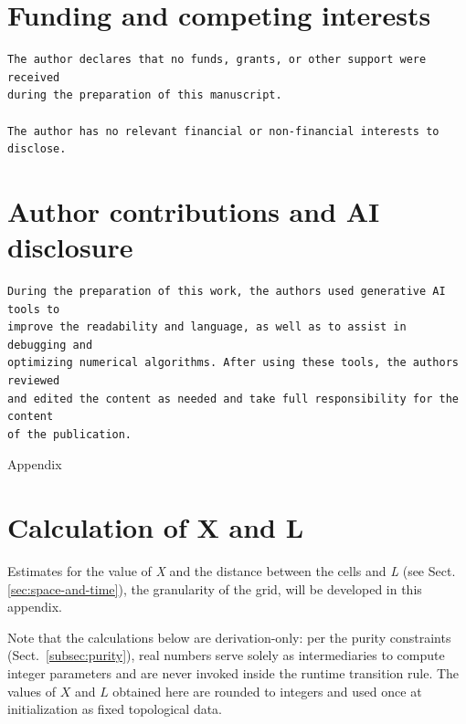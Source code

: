 \documentclass{ijuc}
\begin{document}

\section*{Funding and competing interests}
\begin{verbatim}
The author declares that no funds, grants, or other support were received 
during the preparation of this manuscript.

The author has no relevant financial or non-financial interests to disclose.
\end{verbatim}

\section*{Author contributions and AI disclosure}
\begin{verbatim}
During the preparation of this work, the authors used generative AI tools to
improve the readability and language, as well as to assist in debugging and
optimizing numerical algorithms. After using these tools, the authors reviewed
and edited the content as needed and take full responsibility for the content
of the publication.
\end{verbatim}

\printbibliography

\newpage{}


\appendix
\begin{center}
{\LARGE{}Appendix}{\LARGE\par}
\par\end{center}

\section{Calculation of X and L\label{sec:Calculation-of-X}}

Estimates for the value of \emph{X} and the distance between the cells
and \emph{L} (see Sect. \ref{sec:space-and-time}), the granularity
of the grid, will be developed in this appendix.

Note that the calculations below are derivation-only: per the purity constraints (Sect.~\ref{subsec:purity}), real numbers serve solely as intermediaries to compute integer parameters and are never invoked inside the runtime transition rule.  The values of $X$ and $L$ obtained here are rounded to integers and used once at initialization as fixed topological data.
\end{document}
